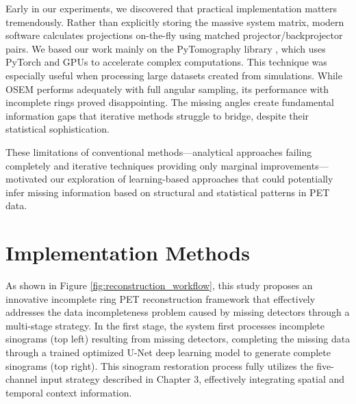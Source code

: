 \documentclass[
reprint,
superscriptaddress,
nofootinbib,
amsmath,amssymb,
aps,
prd,
]{revtex4-2}
\begin{document}
Early in our experiments, we discovered that practical implementation matters tremendously. Rather than explicitly storing the massive system matrix, modern software calculates projections on-the-fly using matched projector/backprojector pairs. We based our work mainly on the PyTomography library \cite{POLSON2025102020}, which uses PyTorch and GPUs to accelerate complex computations. This technique was especially useful when processing large datasets created from simulations.
While OSEM performs adequately with full angular sampling, its performance with incomplete rings proved disappointing. The missing angles create fundamental information gaps that iterative methods struggle to bridge, despite their statistical sophistication. 

These limitations of conventional methods—analytical approaches failing completely and iterative techniques providing only marginal improvements—motivated our exploration of learning-based approaches that could potentially infer missing information based on structural and statistical patterns in PET data.




\section{Implementation Methods}
\label{chap:methods}


As shown in Figure \ref{fig:reconstruction_workflow}, this study proposes an innovative incomplete ring PET reconstruction framework that effectively addresses the data incompleteness problem caused by missing detectors through a multi-stage strategy. In the first stage, the system first processes incomplete sinograms (top left) resulting from missing detectors, completing the missing data through a trained optimized U-Net deep learning model to generate complete sinograms (top right). This sinogram restoration process fully utilizes the five-channel input strategy described in Chapter 3, effectively integrating spatial and temporal context information.
\end{document}
